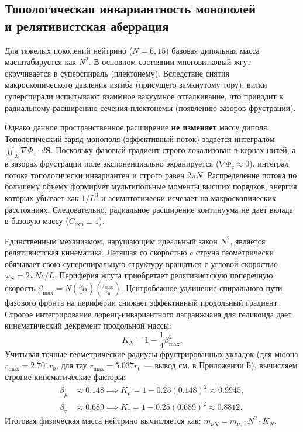 \documentclass[11pt,a4paper]{article}
\begin{document}
	\subsection{Топологическая инвариантность монополей\\ и релятивистская аберрация}
	Для тяжелых поколений нейтрино ($N=6, 15$) базовая дипольная масса масштабируется как $N^2$. В основном состоянии многовитковый жгут скручивается в суперспираль (плектонему). Вследствие снятия макроскопического давления изгиба (присущего замкнутому тору), витки суперспирали испытывают взаимное вакуумное отталкивание, что приводит к радиальному расширению сечения плектонемы (появлению зазоров фрустрации).
	
	Однако данное пространственное расширение \textbf{не изменяет} массу диполя. Топологический заряд монополя (эффективный поток) задается интегралом $\iint_\Sigma \nabla \Phi_z \cdot d\mathbf{S}$. Поскольку фазовый градиент строго локализован в кернах нитей, а в зазорах фрустрации поле экспоненциально экранируется ($\nabla \Phi_z \approx 0$), интеграл потока топологически инвариантен и строго равен $2\pi N$. Распределение потока по большему объему формирует мультипольные моменты высших порядков, энергия которых убывает как $1/L^3$ и асимптотически исчезает на макроскопических расстояниях. Следовательно, радиальное расширение континуума не дает вклада в базовую массу ($C_{\text{exp}} \equiv 1$).
	
	Единственным механизмом, нарушающим идеальный закон $N^2$, является релятивистская кинематика. Летящая со скоростью $c$ струна геометрически обязывает свою суперспиральную структуру вращаться с угловой скоростью $\omega_N = 2\pi N c / L$. Периферия жгута приобретает релятивистскую поперечную скорость $\beta_{\text{max}} = N (\frac{5}{4}\alpha) (\frac{r_{\text{max}}}{r_0})$. 
	Центробежное удлинение спирального пути фазового фронта на периферии снижает эффективный продольный градиент. Строгое интегрирование лоренц-инвариантного лагранжиана для геликоида дает кинематический декремент продольной массы:
	\begin{equation}
		K_N = 1 - \frac{1}{4} \beta_{\text{max}}^2.
	\end{equation}
	Учитывая точные геометрические радиусы фрустрированных укладок (для мюона $r_{\text{max}} = 2.701 r_0$, для тау $r_{\text{max}} = 5.037 r_0$ — вывод см. в Приложении Б), вычисляем строгие кинематические факторы:
	\begin{align}
		\beta_\mu &\approx 0.148 \implies K_\mu = 1 - 0.25(0.148)^2 \approx \mathbf{0.9945}, \\
		\beta_\tau &\approx 0.689 \implies K_\tau = 1 - 0.25(0.689)^2 \approx \mathbf{0.8812}.
	\end{align}
	Итоговая физическая масса нейтрино вычисляется как: $m_{\nu N} = m_{\nu_e} \cdot N^2 \cdot K_N$.
	
\end{document}

